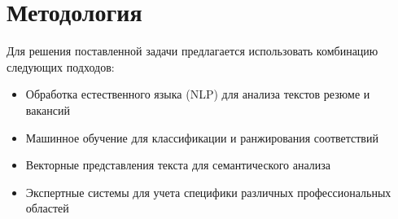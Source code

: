 \documentclass[14pt,a4paper]{article}
\begin{document}
\section{Методология}
Для решения поставленной задачи предлагается использовать комбинацию следующих подходов:
\begin{itemize}
    \item Обработка естественного языка (NLP) для анализа текстов резюме и вакансий
    \item Машинное обучение для классификации и ранжирования соответствий
    \item Векторные представления текста для семантического анализа
    \item Экспертные системы для учета специфики различных профессиональных областей
\end{itemize}
\end{document}
